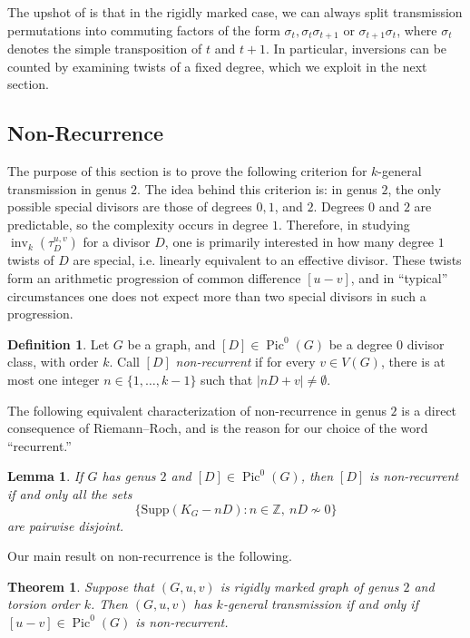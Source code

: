 \documentclass[11pt]{article}
\newtheorem{theorem}[theo]{Theorem}
\newtheorem{lemma}[theo]{Lemma}
\theoremstyle{definition}
\newtheorem{defi}[theo]{Definition}
\numberwithin{equation}{section}
\newcommand{\Z}{\mathbb{Z}}
\newcommand{\inv}{\operatorname{inv}}
\newcommand{\Supp}{\mathrm{Supp}}
\newcommand{\tauD}{\tau^{u,v}_D}
\newcommand{\Pic}{\operatorname{Pic}}
\begin{document}
The upshot of  is that in the rigidly marked case, we can always split transmission permutations into commuting factors of the form $\sigma_t, \sigma_t\sigma_{t+1}$ or $\sigma_{t+1}\sigma_t$, where $\sigma_t$ denotes the simple transposition of $t$ and $t+1$. In particular, inversions can be counted by examining twists of a fixed degree, which we exploit in the next section.


\subsection{Non-Recurrence}

The purpose of this section is to prove the following criterion for $k$-general transmission in genus $2$. The idea behind this criterion is: in genus $2$, the only possible special divisors are those of degrees $0,1$, and $2$. Degrees $0$ and $2$ are predictable, so the complexity occurs in degree $1$. Therefore, in studying $\inv_k(\tauD)$ for a divisor $D$, one is primarily interested in how many degree $1$ twists of $D$ are special, i.e. linearly equivalent to an effective divisor. These twists form an arithmetic progression of common difference $[u-v]$, and in ``typical'' circumstances one does not expect more than two special divisors in such a progression.

\begin{defi}
Let $G$ be a graph, and $[D] \in \Pic^0(G)$ be a degree $0$ divisor class, with order $k$. Call $[D]$ \emph{non-recurrent} if for every $v \in V(G)$, there is at most one integer $n \in \{1,\ldots,k-1\}$ such that $|nD + v| \neq \emptyset$.
\end{defi}

The following equivalent characterization of non-recurrence in genus $2$ is a direct consequence of Riemann--Roch, and is the reason for our choice of the word ``recurrent.''

\begin{lemma}\label{lem:nonrecDisjoint}
If $G$ has genus $2$ and $[D] \in \operatorname{Pic}^0(G)$, then $[D]$ is non-recurrent if and only all the sets $$\{ \Supp(K_G - nD): n \in \Z,\ n D \not\sim 0 \}$$ are pairwise disjoint.
\end{lemma}

Our main result on non-recurrence is the following.

\begin{theorem}
\label{thm:kgtThetas}
Suppose that $(G,u,v)$ is rigidly marked graph of genus $2$ and torsion order $k$. Then $(G,u,v)$ has $k$-general transmission if and only if $[u-v] \in \Pic^0(G)$ is non-recurrent.
\end{theorem}
\end{document}
